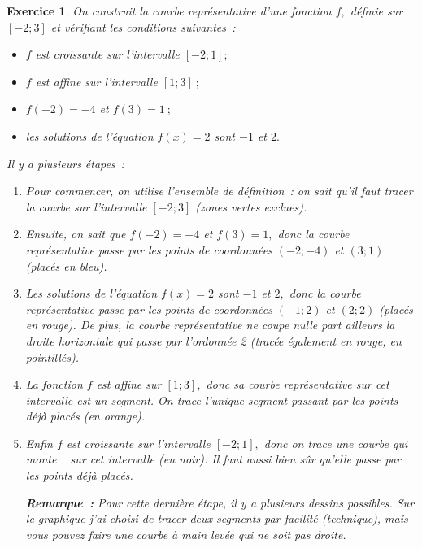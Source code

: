 \documentclass[10pt]{article}
\newtheorem{exo}{Exercice}
\begin{document}
\begin{exo}


On construit la courbe représentative d’une fonction  $f,$ définie sur $\left[-2;3\right]$  et vérifiant les conditions suivantes~:

\begin{itemize}
\item[\textbullet] $f$ est croissante sur l’intervalle $\left[-2;1\right];$
\item[\textbullet] $f$ est affine sur l’intervalle  $\left[1;3\right]~;$
\item[\textbullet] $f(-2)=-4$ et $f(3)=1~;$
\item[\textbullet] les solutions de l'équation $f(x)=2$ sont $-1$ et $2.$
\end{itemize}


Il y a plusieurs étapes~:
\begin{enumerate}
\item Pour commencer, on utilise l'ensemble de définition~: on sait qu'il faut tracer la courbe sur l'intervalle $\left[-2;3\right]$ (zones vertes exclues).
\item Ensuite, on sait que $f(-2)=-4$ et $f(3)=1,$ donc la courbe représentative passe par les points de coordonnées $(-2;-4)$ et $(3;1)$ (placés en bleu).
\item Les solutions de l'équation $f(x)=2$ sont $-1$ et $2,$ donc la courbe représentative passe par les points de coordonnées $(-1;2)$ et $(2;2)$ (placés en rouge). De plus, la courbe représentative ne coupe nulle part ailleurs la droite horizontale qui passe par l'ordonnée 2 (tracée également en rouge, en pointillés).
\item La fonction $f$ est affine sur $\left[1;3\right],$ donc sa courbe représentative sur cet intervalle est un segment. On trace l'unique segment passant par les points déjà placés (en orange).
\item Enfin $f$ est croissante sur l’intervalle $\left[-2;1\right],$ donc on trace une courbe \og qui monte \fg~{} sur cet intervalle (en noir). Il faut aussi bien sûr qu'elle passe par les points déjà placés.

\smallskip

\textbf{Remarque~:} Pour cette dernière étape, il y a plusieurs dessins possibles. Sur le graphique j'ai choisi de tracer deux segments par facilité (technique), mais vous pouvez faire une courbe à main levée qui ne soit pas droite.
\end{enumerate}

\smallskip


\end{exo}
\end{document}
